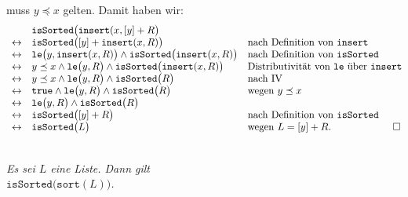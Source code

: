 \begin{enumerate}
            muss $y \preceq x$ gelten.  Damit haben wir:
            $$
            \begin{array}[b]{cll}
               & \mathtt{isSorted}\bigl( \mathtt{insert}(x, [y] + R\bigr) \\
             \leftrightarrow & \mathtt{isSorted}\bigl( [y] + \mathtt{insert}(x, R)\bigr)   & \mbox{nach Definition von $\mathtt{insert}$}\\
             \leftrightarrow & \mathtt{le}\bigl(y, \mathtt{insert}(x,R) \bigr) \wedge \mathtt{isSorted}\bigl( \mathtt{insert}(x,R)\bigr)   
                     & \mbox{nach Definition von $\mathtt{isSorted}$}\\
             \leftrightarrow & y \preceq x \wedge \mathtt{le}\bigl(y, R \bigr) \wedge \mathtt{isSorted}\bigl( \mathtt{insert}(x,R)\bigr)   
                     & \mbox{Distributivit\"at von \texttt{le} \"uber \texttt{insert}}\\
             \leftrightarrow & y \preceq x \wedge \mathtt{le}\bigl(y, R \bigr) \wedge \mathtt{isSorted}\bigl( R \bigr)   
                     & \mbox{nach IV}\\
             \leftrightarrow & \mathtt{true} \wedge \mathtt{le}\bigl(y, R \bigr) \wedge \mathtt{isSorted}\bigl( R \bigr)   
                     & \mbox{wegen $y \preceq x$}\\
             \leftrightarrow & \mathtt{le}\bigl(y, R \bigr) \wedge \mathtt{isSorted}\bigl( R \bigr)   \\
             \leftrightarrow & \mathtt{isSorted}\bigl( [y] + R \bigr)  &
                       \mbox{nach Definition von \texttt{isSorted}} \\
             \leftrightarrow & \mathtt{isSorted}\bigl( L \bigr)  &
                       \mbox{wegen $L = [y] + R$}. \\
            \end{array} \hspace*{-0.5cm} \Box
            $$
\end{enumerate}

\begin{Satz} \hspace*{\fill}\\
{\em
  Es sei $L$ eine Liste. Dann gilt \\[0.1cm]
  \hspace*{1.3cm} $\mathtt{isSorted}\bigl(\mathtt{sort}(L) \bigr)$. 
}  
\end{Satz}

